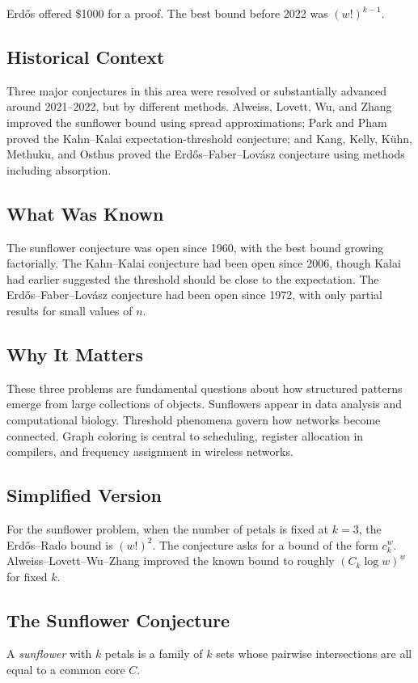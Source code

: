 Erd\H{o}s offered \$1000 for a proof. The best bound before 2022 was $(w!)^{k-1}$.

\subsection{Historical Context}
Three major conjectures in this area were resolved or substantially advanced around 2021--2022, but by different methods. Alweiss, Lovett, Wu, and Zhang improved the sunflower bound using spread approximations; Park and Pham proved the Kahn--Kalai expectation-threshold conjecture; and Kang, Kelly, K\"uhn, Methuku, and Osthus proved the Erd\H{o}s--Faber--Lov\'{a}sz conjecture using methods including absorption.

\subsection{What Was Known}
The sunflower conjecture was open since 1960, with the best bound growing factorially. The Kahn--Kalai conjecture had been open since 2006, though Kalai had earlier suggested the threshold should be close to the expectation. The Erd\H{o}s--Faber--Lov\'{a}sz conjecture had been open since 1972, with only partial results for small values of $n$.

\subsection{Why It Matters}
These three problems are fundamental questions about how structured patterns emerge from large collections of objects. Sunflowers appear in data analysis and computational biology. Threshold phenomena govern how networks become connected. Graph coloring is central to scheduling, register allocation in compilers, and frequency assignment in wireless networks.

\subsection{Simplified Version}
For the sunflower problem, when the number of petals is fixed at $k = 3$, the Erd\H{o}s--Rado bound is $(w!)^2$. The conjecture asks for a bound of the form $c_k^w$. Alweiss--Lovett--Wu--Zhang improved the known bound to roughly $(C_k\log w)^w$ for fixed $k$.

\subsection{The Sunflower Conjecture}
A \emph{sunflower} with $k$ petals is a family of $k$ sets whose pairwise intersections are all equal to a common core $C$.

